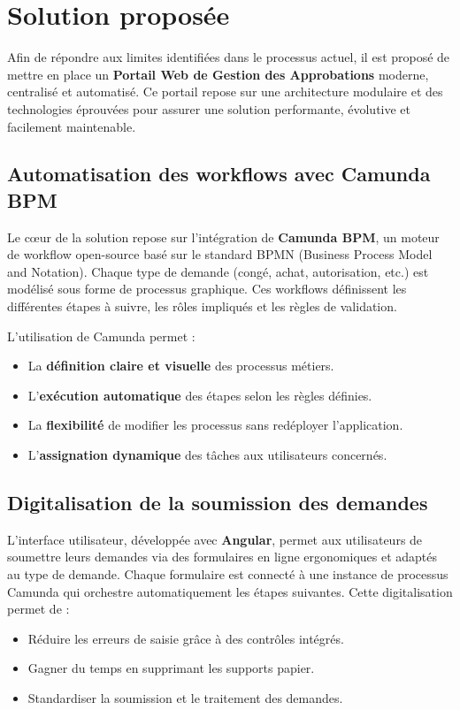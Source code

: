 \section{Solution proposée}

Afin de répondre aux limites identifiées dans le processus actuel, il est proposé de mettre en place un \textbf{Portail Web de Gestion des Approbations} moderne, centralisé et automatisé. Ce portail repose sur une architecture modulaire et des technologies éprouvées pour assurer une solution performante, évolutive et facilement maintenable.

\subsection*{Automatisation des workflows avec Camunda BPM}

Le cœur de la solution repose sur l'intégration de \textbf{Camunda BPM}, un moteur de workflow open-source basé sur le standard BPMN (Business Process Model and Notation). Chaque type de demande (congé, achat, autorisation, etc.) est modélisé sous forme de processus graphique. Ces workflows définissent les différentes étapes à suivre, les rôles impliqués et les règles de validation.

L’utilisation de Camunda permet :
\begin{itemize}
    \item La \textbf{définition claire et visuelle} des processus métiers.
    \item L’\textbf{exécution automatique} des étapes selon les règles définies.
    \item La \textbf{flexibilité} de modifier les processus sans redéployer l’application.
    \item L’\textbf{assignation dynamique} des tâches aux utilisateurs concernés.
\end{itemize}

\subsection*{Digitalisation de la soumission des demandes}

L’interface utilisateur, développée avec \textbf{Angular}, permet aux utilisateurs de soumettre leurs demandes via des formulaires en ligne ergonomiques et adaptés au type de demande. Chaque formulaire est connecté à une instance de processus Camunda qui orchestre automatiquement les étapes suivantes. Cette digitalisation permet de :
\begin{itemize}
    \item Réduire les erreurs de saisie grâce à des contrôles intégrés.
    \item Gagner du temps en supprimant les supports papier.
    \item Standardiser la soumission et le traitement des demandes.
\end{itemize}
\newpage
